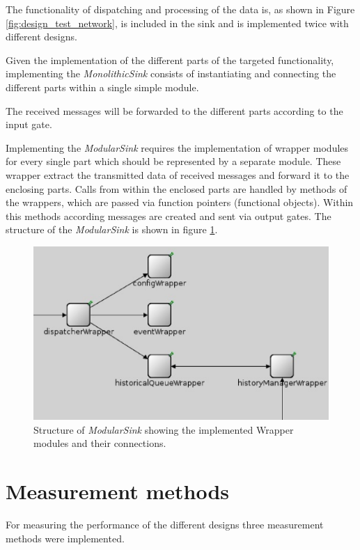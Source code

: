 The functionality of dispatching and processing of the data is, as shown in Figure \ref{fig:design_test_network}, is included in the sink and is implemented twice with different designs.


Given the implementation of the different parts of the targeted functionality, implementing the \emph{MonolithicSink} consists of instantiating and connecting the different parts within a single simple module.

The received messages will be forwarded to the different parts according to the input gate.

Implementing the \emph{ModularSink} requires the implementation of wrapper modules for every single part which should be represented by a separate module.
These wrapper extract the transmitted data of received messages and forward it to the enclosing parts.
Calls from within the enclosed parts are handled by methods of the wrappers, which are passed via function pointers (functional objects).
Within this methods according messages are created and sent via output gates.
The structure of the \emph{ModularSink} is shown in figure \ref{fig:ModularSink}.

\begin{figure}
    \centering
    \includegraphics[width=0.9\linewidth]{images/ModularSink}
    \caption{Structure of \emph{ModularSink} showing the implemented Wrapper modules and their connections.}
    \label{fig:ModularSink}
\end{figure}


\section{Measurement methods}
\label{sec:measurements_methods}
For measuring the performance of the different designs three measurement methods were implemented.

